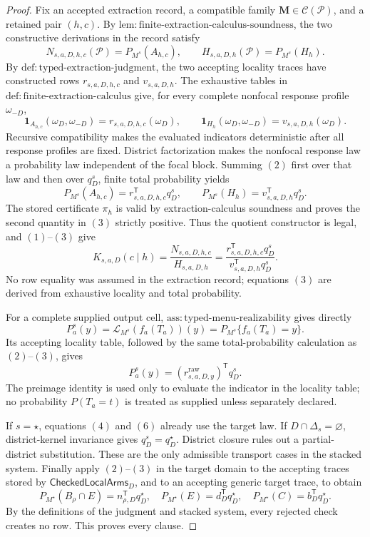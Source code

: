 \documentclass{article}
\begin{document}
\begin{proof}
Fix an accepted extraction record, a compatible family \(\mathbf M\in\mathcal C(\mathcal P)\), and a retained pair \((h,c)\).  By \(\mathrm{lem:finite\text{-}extraction\text{-}calculus\text{-}soundness}\), the two constructive derivations in the record satisfy
\[
N_{s,a,D,h,c}(\mathcal P)=P_{M^s}(A_{h,c}),
\qquad
H_{s,a,D,h}(\mathcal P)=P_{M^s}(H_h).
\tag{1}
\]
By \(\mathrm{def:typed\text{-}extraction\text{-}judgment}\), the two accepting locality traces have constructed rows \(r_{s,a,D,h,c}\) and \(v_{s,a,D,h}\).  The exhaustive tables in \(\mathrm{def:finite\text{-}extraction\text{-}calculus}\) give, for every complete nonfocal response profile \(\omega_{-D}\),
\[
\mathbf 1_{A_{h,c}}(\omega_D,\omega_{-D})
=r_{s,a,D,h,c}(\omega_D),
\qquad
\mathbf 1_{H_h}(\omega_D,\omega_{-D})
=v_{s,a,D,h}(\omega_D).
\tag{2}
\]
Recursive compatibility makes the evaluated indicators deterministic after all response profiles are fixed.  District factorization makes the nonfocal response law a probability law independent of the focal block.  Summing \((2)\) first over that law and then over \(q_D^s\), finite total probability yields
\[
P_{M^s}(A_{h,c})=r_{s,a,D,h,c}^{\mathsf T}q_D^s,
\qquad
P_{M^s}(H_h)=v_{s,a,D,h}^{\mathsf T}q_D^s.
\tag{3}
\]
The stored certificate \(\pi_h\) is valid by extraction-calculus soundness and proves the second quantity in \((3)\) strictly positive.  Thus the quotient constructor is legal, and \((1)\)--\((3)\) give
\[
K_{s,a,D}(c\mid h)
=\frac{N_{s,a,D,h,c}}{H_{s,a,D,h}}
=\frac{r_{s,a,D,h,c}^{\mathsf T}q_D^s}
{v_{s,a,D,h}^{\mathsf T}q_D^s}.
\tag{4}
\]
No row equality was assumed in the extraction record; equations \((3)\) are derived from exhaustive locality and total probability.

For a complete supplied output cell, \(\mathrm{ass:typed\text{-}menu\text{-}realizability}\) gives directly
\[
P_a^s(y)=\mathcal L_{M^s}(f_a(T_a))(y)
=P_{M^s}\{f_a(T_a)=y\}.
\tag{5}
\]
Its accepting locality table, followed by the same total-probability calculation as \((2)\)--\((3)\), gives
\[
P_a^s(y)=(r^{\mathrm{raw}}_{s,a,D,y})^{\mathsf T}q_D^s.
\tag{6}
\]
The preimage identity is used only to evaluate the indicator in the locality table; no probability \(P(T_a=t)\) is treated as supplied unless separately declared.

If \(s=\star\), equations \((4)\) and \((6)\) already use the target law.  If \(D\cap\Delta_s=\varnothing\), district-kernel invariance gives \(q_D^s=q_D^\star\).  District closure rules out a partial-district substitution.  These are the only admissible transport cases in the stacked system.  Finally apply \((2)\)--\((3)\) in the target domain to the accepting traces stored by \(\mathsf{CheckedLocalArms}_D\), and to an accepting generic target trace, to obtain
\[
P_{M^\star}(B_\rho\cap E)=n_{\rho,D}^{\mathsf T}q_D^\star,
\quad
P_{M^\star}(E)=d_D^{\mathsf T}q_D^\star,
\quad
P_{M^\star}(C)=b_D^{\mathsf T}q_D^\star.
\tag{7}
\]
By the definitions of the judgment and stacked system, every rejected check creates no row.  This proves every clause.
\end{proof}
\end{document}
